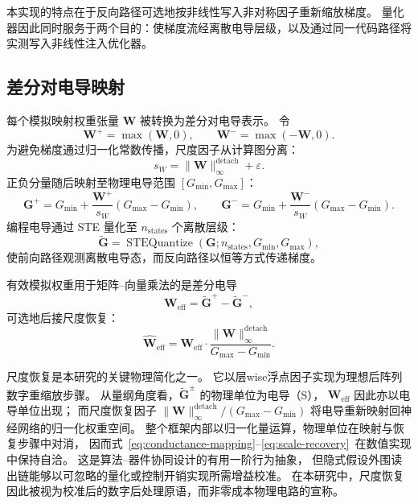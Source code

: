 本实现的特点在于反向路径可选地按非线性写入非对称因子重新缩放梯度。
量化器因此同时服务于两个目的：使梯度流经离散电导层级，以及通过同一代码路径将实测写入非线性注入优化器。

\subsection{差分对电导映射}

每个模拟映射权重张量 $\mathbf{W}$ 被转换为差分对电导表示。
令
\begin{equation}
\mathbf{W}^{+} = \max(\mathbf{W}, 0), \qquad
\mathbf{W}^{-} = \max(-\mathbf{W}, 0).
\label{eq:weight-split}
\end{equation}
为避免梯度通过归一化常数传播，尺度因子从计算图分离：
\begin{equation}
s_W = \lVert \mathbf{W} \rVert_{\infty}^{\mathrm{detach}} + \varepsilon.
\label{eq:scale-detach}
\end{equation}
正负分量随后映射至物理电导范围 $[G_{\min}, G_{\max}]$：
\begin{equation}
\mathbf{G}^{+} = G_{\min} + \frac{\mathbf{W}^{+}}{s_W}(G_{\max} - G_{\min}), \qquad
\mathbf{G}^{-} = G_{\min} + \frac{\mathbf{W}^{-}}{s_W}(G_{\max} - G_{\min}).
\label{eq:conductance-mapping}
\end{equation}
编程电导通过 STE 量化至 $n_{\text{states}}$ 个离散层级：
\begin{equation}
\widetilde{\mathbf{G}} = \operatorname{STEQuantize}(\mathbf{G}; n_{\text{states}}, G_{\min}, G_{\max}),
\label{eq:ste-quantize}
\end{equation}
使前向路径观测离散电导态，而反向路径以恒等方式传递梯度。

有效模拟权重用于矩阵--向量乘法的是差分电导
\begin{equation}
\mathbf{W}_{\text{eff}} = \widetilde{\mathbf{G}}^{+} - \widetilde{\mathbf{G}}^{-},
\label{eq:eff-weight}
\end{equation}
可选地后接尺度恢复：
\begin{equation}
\widehat{\mathbf{W}}_{\text{eff}} = \mathbf{W}_{\text{eff}} \cdot \frac{\lVert \mathbf{W} \rVert_{\infty}^{\mathrm{detach}}}{G_{\max} - G_{\min}}.
\label{eq:scale-recovery}
\end{equation}

尺度恢复是本研究的关键物理简化之一。
它以层wise浮点因子实现为理想后阵列数字重缩放步骤。
从量纲角度看，$\widetilde{\mathbf{G}}^{\pm}$ 的物理单位为电导（S），
$\mathbf{W}_{\text{eff}}$ 因此亦以电导单位出现；
而尺度恢复因子 $\lVert \mathbf{W} \rVert_{\infty}^{\text{detach}} / (G_{\max} - G_{\min})$
将电导重新映射回神经网络的归一化权重空间。
整个框架内部以归一化量运算，物理单位在映射与恢复步骤中对消，
因而式~\ref{eq:conductance-mapping}--\ref{eq:scale-recovery}~在数值实现中保持自洽。
这是算法--器件协同设计的有用一阶行为抽象，
但隐式假设外围读出链能够以可忽略的量化或控制开销实现所需增益校准。
在本研究中，尺度恢复因此被视为校准后的数字后处理原语，而非零成本物理电路的宣称。

